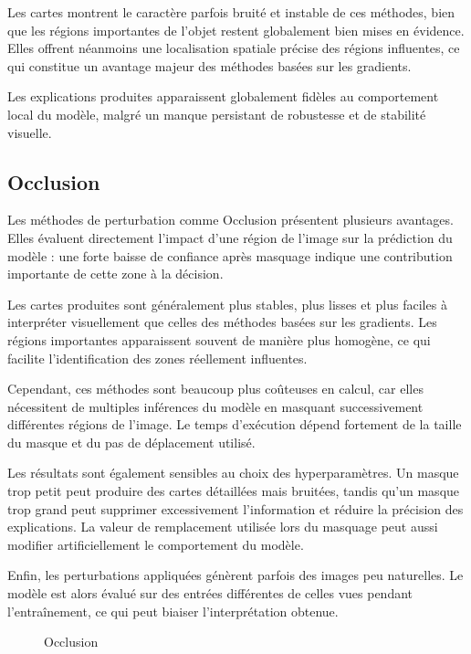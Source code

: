 \documentclass{ir}
\begin{document}
Les cartes montrent le caractère parfois bruité et instable de ces méthodes, bien que les régions importantes de l'objet restent globalement bien mises en évidence.
Elles offrent néanmoins une localisation spatiale précise des régions influentes, ce qui constitue un avantage majeur des méthodes basées sur les gradients.

Les explications produites apparaissent globalement fidèles au comportement local du modèle, malgré un manque persistant de robustesse et de stabilité visuelle.

\subsection{Occlusion}

Les méthodes de perturbation comme Occlusion présentent plusieurs avantages.
Elles évaluent directement l'impact d'une région de l'image sur la prédiction du modèle : une forte baisse de confiance après masquage indique une contribution importante de cette zone à la décision.

Les cartes produites sont généralement plus stables, plus lisses et plus faciles à interpréter visuellement que celles des méthodes basées sur les gradients.
Les régions importantes apparaissent souvent de manière plus homogène, ce qui facilite l'identification des zones réellement influentes.

Cependant, ces méthodes sont beaucoup plus coûteuses en calcul, car elles nécessitent de multiples inférences du modèle en masquant successivement différentes régions de l'image.
Le temps d'exécution dépend fortement de la taille du masque et du pas de déplacement utilisé.

Les résultats sont également sensibles au choix des hyperparamètres.
Un masque trop petit peut produire des cartes détaillées mais bruitées, tandis qu'un masque trop grand peut supprimer excessivement l'information et réduire la précision des explications.
La valeur de remplacement utilisée lors du masquage peut aussi modifier artificiellement le comportement du modèle.

Enfin, les perturbations appliquées génèrent parfois des images peu naturelles.
Le modèle est alors évalué sur des entrées différentes de celles vues pendant l'entraînement, ce qui peut biaiser l'interprétation obtenue.

\begin{figure}
    \caption{Occlusion}
    \label{fig:occ1}
\end{figure}
\end{document}
